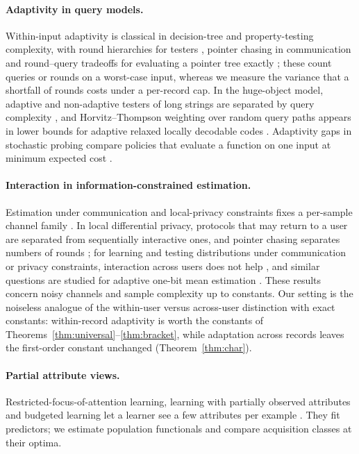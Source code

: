 \documentclass{article}
\begin{document}
\paragraph{Adaptivity in query models.} Within-input adaptivity is classical in decision-tree and property-testing complexity, with round hierarchies for testers \citep{canonne2018}, pointer chasing in communication \citep{nisan1993} and round--query tradeoffs for evaluating a pointer tree exactly \citep{cook2012,li2026regex}; these count queries or rounds on a worst-case input, whereas we measure the variance that a shortfall of rounds costs under a per-record cap. In the huge-object model, adaptive and non-adaptive testers of long strings are separated by query complexity \citep{goldreich2022,chakraborty2023,adar2024}, and Horvitz--Thompson weighting over random query paths appears in lower bounds for adaptive relaxed locally decodable codes \citep{goldberg2026}. Adaptivity gaps in stochastic probing compare policies that evaluate a function on one input at minimum expected cost \citep{gupta2016,hellerstein2022}.

\paragraph{Interaction in information-constrained estimation.} Estimation under communication and local-privacy constraints fixes a per-sample channel family \citep{acharya2019,barnes2020}. In local differential privacy, protocols that may return to a user are separated from sequentially interactive ones, and pointer chasing separates numbers of rounds \citep{joseph2019,joseph2020}; for learning and testing distributions under communication or privacy constraints, interaction across users does not help \citep{acharya2022tit}, and similar questions are studied for adaptive one-bit mean estimation \citep{lau2026}. These results concern noisy channels and sample complexity up to constants. Our setting is the noiseless analogue of the within-user versus across-user distinction with exact constants: within-record adaptivity is worth the constants of Theorems~\ref{thm:universal}--\ref{thm:bracket}, while adaptation across records leaves the first-order constant unchanged (Theorem~\ref{thm:char}).

\paragraph{Partial attribute views.} Restricted-focus-of-attention learning, learning with partially observed attributes and budgeted learning let a learner see a few attributes per example \citep{bendavid1998,cesa2011,hazan2012,lizotte2003,kapoor2005}. They fit predictors; we estimate population functionals and compare acquisition classes at their optima.
\end{document}
